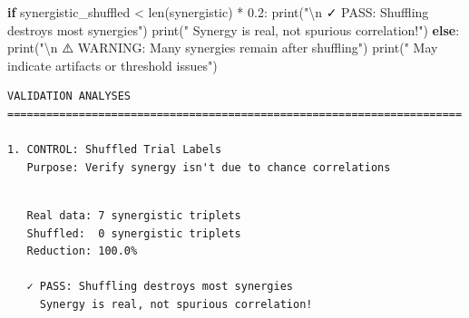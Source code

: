 \documentclass[
  11pt,
  letterpaper,
  oneside,
  openany]{book}
\newenvironment{Shaded}{\begin{snugshade}}{\end{snugshade}}
\newcommand{\BuiltInTok}[1]{\textcolor[rgb]{0.00,0.23,0.31}{#1}}
\newcommand{\CharTok}[1]{\textcolor[rgb]{0.13,0.47,0.30}{#1}}
\newcommand{\ControlFlowTok}[1]{\textcolor[rgb]{0.00,0.23,0.31}{\textbf{#1}}}
\newcommand{\FloatTok}[1]{\textcolor[rgb]{0.68,0.00,0.00}{#1}}
\newcommand{\NormalTok}[1]{\textcolor[rgb]{0.00,0.23,0.31}{#1}}
\newcommand{\OperatorTok}[1]{\textcolor[rgb]{0.37,0.37,0.37}{#1}}
\newcommand{\StringTok}[1]{\textcolor[rgb]{0.13,0.47,0.30}{#1}}
\begin{document}
\begin{Shaded}
\begin{Highlighting}[]
\ControlFlowTok{if}\NormalTok{ synergistic\_shuffled }\OperatorTok{\textless{}} \BuiltInTok{len}\NormalTok{(synergistic) }\OperatorTok{*} \FloatTok{0.2}\NormalTok{:}
    \BuiltInTok{print}\NormalTok{(}\StringTok{"}\CharTok{\textbackslash{}n}\StringTok{   ✓ PASS: Shuffling destroys most synergies"}\NormalTok{)}
    \BuiltInTok{print}\NormalTok{(}\StringTok{"     Synergy is real, not spurious correlation!"}\NormalTok{)}
\ControlFlowTok{else}\NormalTok{:}
    \BuiltInTok{print}\NormalTok{(}\StringTok{"}\CharTok{\textbackslash{}n}\StringTok{   ⚠️  WARNING: Many synergies remain after shuffling"}\NormalTok{)}
    \BuiltInTok{print}\NormalTok{(}\StringTok{"     May indicate artifacts or threshold issues"}\NormalTok{)}
\end{Highlighting}
\end{Shaded}

\begin{verbatim}
VALIDATION ANALYSES
======================================================================

1. CONTROL: Shuffled Trial Labels
   Purpose: Verify synergy isn't due to chance correlations
\end{verbatim}

\begin{verbatim}

   Real data: 7 synergistic triplets
   Shuffled:  0 synergistic triplets
   Reduction: 100.0%

   ✓ PASS: Shuffling destroys most synergies
     Synergy is real, not spurious correlation!
\end{verbatim}
\end{document}
